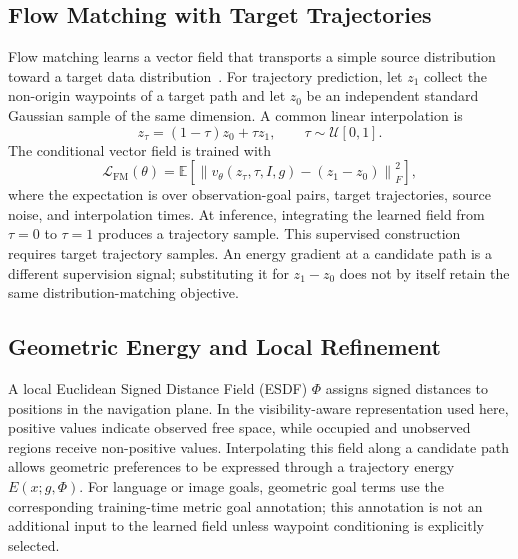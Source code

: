 \documentclass[letterpaper, 10 pt, conference]{ieeeconf}  %
\begin{document}
\subsection{Flow Matching with Target Trajectories}
\label{sec:bg_flow_matching}

Flow matching learns a vector field that transports a simple source
distribution toward a target data distribution~\cite{flowmatching}.
For trajectory prediction, let $z_1$ collect the non-origin waypoints
of a target path and let $z_0$ be an independent standard Gaussian
sample of the same dimension. A common linear interpolation is
\begin{equation}
    z_\tau = (1-\tau)z_0 + \tau z_1,
    \qquad \tau\sim\mathcal{U}[0,1].
\end{equation}
The conditional vector field is trained with
\begin{equation}
    \mathcal{L}_{\mathrm{FM}}(\theta)
    = \mathbb{E}\!\left[
        \left\|v_\theta(z_\tau,\tau,I,g)-(z_1-z_0)\right\|_F^2
      \right],
\end{equation}
where the expectation is over observation-goal pairs, target
trajectories, source noise, and interpolation times. At inference,
integrating the learned field from $\tau=0$ to $\tau=1$ produces a
trajectory sample. This supervised construction requires target
trajectory samples. An energy gradient at a candidate path is a
different supervision signal; substituting it for $z_1-z_0$ does
not by itself retain the same distribution-matching objective.

\subsection{Geometric Energy and Local Refinement}
\label{sec:bg_energy}

A local Euclidean Signed Distance Field (ESDF) $\Phi$ assigns signed
distances to positions in the navigation plane. In the visibility-aware
representation used here, positive values indicate observed free space,
while occupied and unobserved regions receive non-positive values.
Interpolating this field along a
candidate path allows geometric preferences to be expressed through
a trajectory energy $E(x;g,\Phi)$. For language or image goals,
geometric goal terms use the corresponding training-time metric goal
annotation; this annotation is not an additional input to the learned
field unless waypoint conditioning is explicitly selected.
\end{document}
